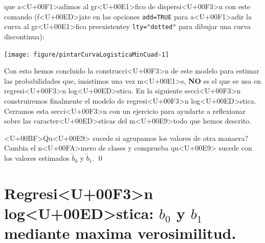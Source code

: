 \documentclass[10pt,a4paper]{article}
\newcounter {cont01}
\begin{document}
\begin{enumerate}
que a<U+00F1>adimos al gr<U+00E1>fico de dispersi<U+00F3>n con este comando (f<U+00ED>jate en las opciones {\tt add=TRUE} para a<U+00F1>adir la curva al gr<U+00E1>fico preexistentey \verb#lty="dotted"# para dibujar una curva discontinua):

\begin{knitrout}
\color{fgcolor}\begin{kframe}
\begin{alltt}
 \hlstd{=}\hlstd{,} \hlstd{=}\hlstd{,} \hlstd{=}\hlstd{)}
  \hlstd{=} \hlopt{-}\hlstd{,}  \hlstd{=} \hlstd{,}
      \hlstd{=}\hlstd{,} \hlstd{=}\hlstd{,} \hlstd{=}\hlstd{,} \hlstd{=}\hlstd{)}
\end{alltt}
\end{kframe}

{\centering \texttt{[image: figure/pintarCurvaLogisticaMinCuad-1]} 

}



\end{knitrout}

\end{enumerate}

Con esto hemos concluido la construcci<U+00F3>n de este modelo para estimar las probabilidades que, insistimos una vez m<U+00E1>s, {\bf NO} es el que se usa en regresi<U+00F3>n log<U+00ED>stica. En la siguiente secci<U+00F3>n construiremos finalmente el modelo de regresi<U+00F3>n log<U+00ED>stica. Cerramos esta secci<U+00F3>n con un ejercicio para ayudarte a reflexionar sobre las caracter<U+00ED>sticas del m<U+00E9>todo que hemos descrito.

\begin{ejercicio}
\label{tut13:ejercicio04}
<U+00BF>Qu<U+00E9> sucede  si agrupamos los valores de otra manaera? Cambia el n<U+00FA>mero de clases y comprueba qu<U+00E9> sucede con los valores estimados $\widetilde b_0$ y $\widetilde b_1$.
\qed
\end{ejercicio}


\section{Regresi<U+00F3>n log<U+00ED>stica:  $b_0$ y $b_1$  mediante maxima verosimilitud.}
\label{tut13:section:ParametrosCurvaSigmoideaMedianteMaximaVerosimilitud}
\end{document}
